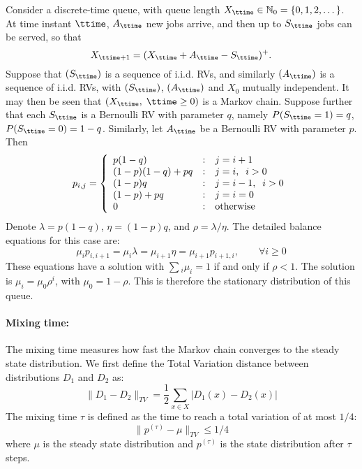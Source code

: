 \begin{example} Consider a discrete-time queue, with queue length $X_\ttime\in \mathbb{N}_0=\{0,1,2,\dots\}$. At time instant $\ttime$, ${A_\ttime}$ new jobs arrive, and then up to ${S_\ttime}$ jobs can be served, so that
\[{X_{\ttime +1}} = {({X_\ttime} + {A_\ttime} - {S_\ttime})^ + }.\]
Suppose that $({S_\ttime})$ is a sequence of i.i.d. RVs, and
similarly $({A_\ttime})$ is a sequence of i.i.d. RVs, with
$({S_\ttime})$, $({A_\ttime})$ and ${X_0}$ mutually independent. It
may then be seen that $({X_\ttime},\;\ttime \ge 0)$ is a Markov chain.
Suppose further that each ${S_\ttime}$ is a Bernoulli RV with
parameter $q$, namely $P({S_\ttime} = 1) = q$, $P({S_\ttime} = 0) =
1 - q$. Similarly, let ${A_\ttime}$ be a Bernoulli RV with parameter
$p$. Then
\[{p_{i,j}} = \left\{ {\begin{array}{*{20}{l}}
{p(1 - q)}&:&{j = i + 1}\\
{(1 - p)(1 - q) + pq}&:&{j = i,\;\;i > 0}\\
{(1 - p)q}&:&{j = i - 1,\;\;i > 0}\\
{(1 - p) + pq}&:&{j = i = 0}\\
0&:&{{\rm{otherwise}}}
\end{array}} \right.\]
 Denote $\lambda  = p(1 - q)$, $\eta  = (1 - p)q$, and $\rho  = \lambda /\eta $.   The detailed balance equations for this case are:
\[
\mu_i p_{i,i+1}={\mu _i}\lambda  = {\mu _{i + 1}}\eta=\mu_{i+1}p_{i+1,i} ,\quad \quad \forall i \ge 0\]
These equations have a solution with $\sum {_i{\mu _i} = 1}$ if and
only if $\rho  < 1$. The solution is ${\mu _i} = {\mu _0}{\rho ^i}$,
with ${\mu _0} = 1 - \rho $. This is therefore the stationary
distribution of this queue.
\end{example}


\paragraph{Mixing time:} %
The mixing time measures how fast the Markov chain converges to the steady state distribution. We first define the Total Variation distance between distributions $D_1$ and $D_2$ as:
\[
\|D_1-D_2\|_{TV}=\frac{1}{2}\sum_{x\in X} | D_1 (x) - D_2(x) |
\]
The mixing time $\tau$ is defined as the time to reach a total variation of at most $1/4$:
\[
\|p^{(\tau)}-\mu\|_{TV}\leq 1/4
\]
where $\mu$ is the steady state distribution and $p^{(\tau)}$ is the state distribution after $\tau$ steps.
